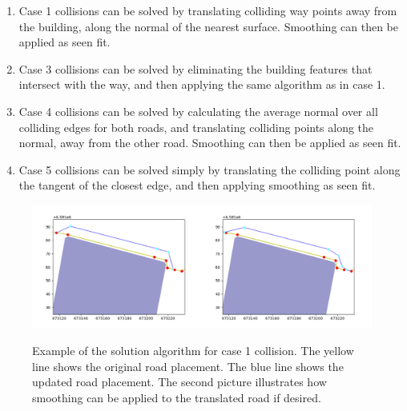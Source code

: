 \documentclass{kththesis}
\begin{document}
\begin{enumerate}
\item Case 1 collisions can be solved by translating colliding way points away from the building, along the normal of the nearest surface. Smoothing can then be applied as seen fit.
\item Case 3 collisions can be solved by eliminating the building features that intersect with the way, and then applying the same algorithm as in case 1.
\item Case 4 collisions can be solved by calculating the average normal over all colliding edges for both roads, and translating colliding points along the normal, away from the other road. Smoothing can then be applied as seen fit.
\item Case 5 collisions can be solved simply by translating the colliding point along the tangent of the closest edge, and then applying smoothing as seen fit.
\end{enumerate}

\begin{figure}[H]
    \centering
    \includegraphics[width=\textwidth,height=0.5\textheight,keepaspectratio]{img_feature_overlap_fix_1}
    \label{fig:collision-case-1}
    \caption{Example of the solution algorithm for case 1 collision. The yellow line shows the original road placement. The blue line shows the updated road placement. The second picture illustrates how smoothing can be applied to the translated road if desired.}
\end{figure}
\end{document}
